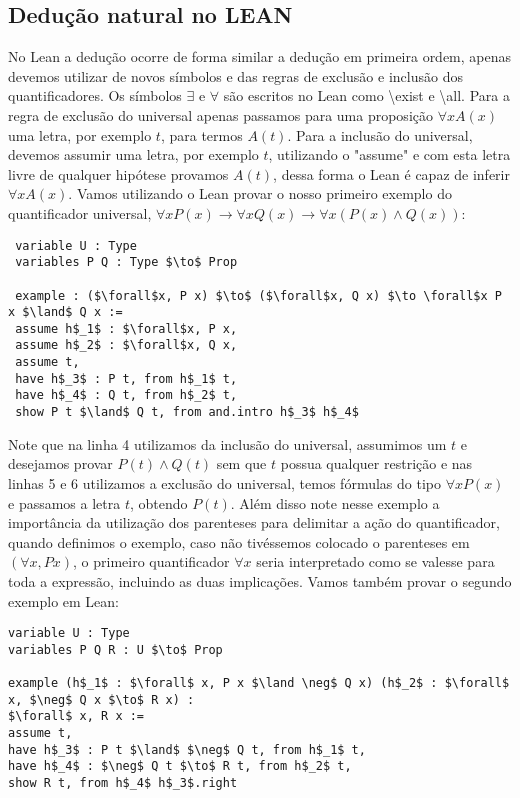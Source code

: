 \subsection{Dedução natural no LEAN}
No Lean a dedução ocorre de forma similar a dedução em primeira ordem, apenas devemos utilizar de novos símbolos e das 
regras de exclusão e inclusão dos quantificadores. Os símbolos $\exists $ e $\forall $ são escritos no Lean como \textbackslash exist 
e  \textbackslash all. Para a regra de exclusão do universal apenas passamos para uma proposição $\forall x A(x)$ uma letra,
por exemplo $t$, para termos $A(t)$. Para a inclusão do universal, devemos assumir uma letra, por exemplo $t$, utilizando o
"assume" e com esta letra livre de qualquer hipótese provamos $A(t)$, dessa forma o Lean é capaz de inferir $\forall x A(x)$.
\newline Vamos utilizando o Lean provar o nosso primeiro exemplo do quantificador universal, $\forall xP(x) \to \forall x Q(x) \to \forall x(P(x) \land Q(x))$:
\begin{lstlisting}
 variable U : Type
 variables P Q : Type $\to$ Prop

 example : ($\forall$x, P x) $\to$ ($\forall$x, Q x) $\to \forall$x P x $\land$ Q x :=  
 assume h$_1$ : $\forall$x, P x,
 assume h$_2$ : $\forall$x, Q x,
 assume t,
 have h$_3$ : P t, from h$_1$ t,
 have h$_4$ : Q t, from h$_2$ t,
 show P t $\land$ Q t, from and.intro h$_3$ h$_4$ 
\end{lstlisting}
Note que na linha 4 utilizamos da inclusão do universal, assumimos um $t$ e desejamos provar $P(t) \land Q(t)$ 
sem que $t$ possua qualquer restrição e nas linhas 5 e 6 utilizamos a exclusão do universal, temos fórmulas do
tipo $\forall x P(x)$ e passamos a letra $t$, obtendo $P(t)$. Além disso note nesse exemplo a importância da utilização
dos parenteses para delimitar a ação do quantificador, quando definimos o exemplo, caso não tivéssemos colocado
o parenteses em  $(\forall x, P x)$, o primeiro quantificador $\forall x$ seria interpretado como se valesse para toda
a expressão, incluindo as duas implicações.
\newline Vamos também provar o segundo exemplo em Lean:
\begin{lstlisting}
variable U : Type
variables P Q R : U $\to$ Prop

example (h$_1$ : $\forall$ x, P x $\land \neg$ Q x) (h$_2$ : $\forall$ x, $\neg$ Q x $\to$ R x) :
$\forall$ x, R x :=
assume t,
have h$_3$ : P t $\land$ $\neg$ Q t, from h$_1$ t,
have h$_4$ : $\neg$ Q t $\to$ R t, from h$_2$ t,
show R t, from h$_4$ h$_3$.right
\end{lstlisting}
